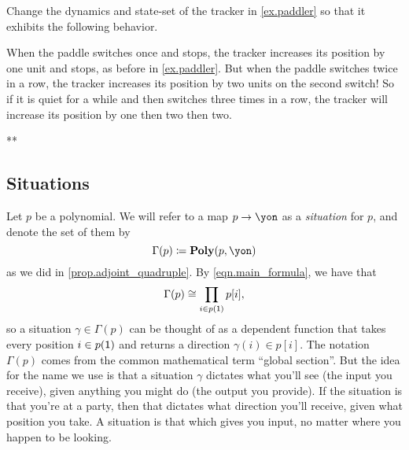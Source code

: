 \documentclass[Book-Poly]{subfiles}
\begin{document}
\begin{exercise}
Change the dynamics and state-set of the tracker in \cref{ex.paddler} so that it exhibits the following behavior.

When the paddle switches once and stops, the tracker increases its position by one unit and stops, as before in \cref{ex.paddler}. But when the paddle switches twice in a row, the tracker increases its position by two units on the second switch! So if it is quiet for a while and then switches three times in a row, the tracker will increase its position by one then two then two.
\begin{solution}
**
\end{solution}
\end{exercise}

\subsection{Situations} %
Let $p$ be a polynomial. We will refer to a map $p\to\yon$ as a \emph{situation} for $p$, and denote the set of them by
\begin{equation} \label{eqn.gamma_def}
\Gamma(p)\coloneqq\poly(p,\yon)
\end{equation}
as we did in \cref{prop.adjoint_quadruple}.
By \eqref{eqn.main_formula}, we have that
\begin{equation} \label{eqn.gamma_prod}
    \Gamma(p) \cong \prod_{i \in p(\textsf{1})} p[i],
\end{equation}
so a situation $\gamma \in \Gamma(p)$ can be thought of as a dependent function that takes every position $i\in p(\textsf{1})$ and returns a direction $\gamma(i)\in p[i]$. The notation $\Gamma(p)$ comes from the common mathematical term ``global section''. But the idea for the name we use is that a situation $\gamma$ dictates what you'll see (the input you receive), given anything you might do (the output you provide). If the situation is that you're at a party, then that dictates what direction you'll receive, given what position you take. A situation is that which gives you input, no matter where you happen to be looking.
\end{document}
